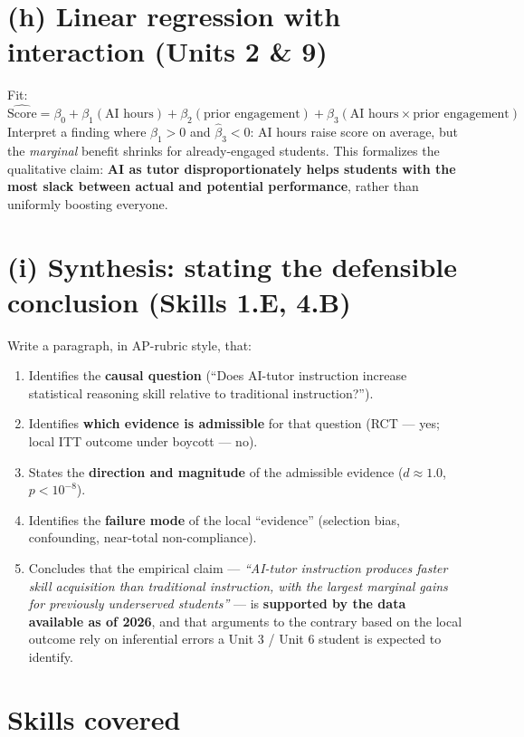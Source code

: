\documentclass[11pt]{article}
\begin{document}
\section{(h) Linear regression with interaction \textnormal{\small(Units 2 \& 9)}}

Fit:
\[
\widehat{\text{Score}} = \beta_0 + \beta_1(\text{AI hours})
  + \beta_2(\text{prior engagement})
  + \beta_3(\text{AI hours} \times \text{prior engagement})
\]
Interpret a finding where $\hat\beta_1 > 0$ and $\hat\beta_3 < 0$:
AI hours raise score on average, but the \emph{marginal} benefit
shrinks for already-engaged students. This formalizes the qualitative
claim: \textbf{AI as tutor disproportionately helps students with the
most slack between actual and potential performance}, rather than
uniformly boosting everyone.

\section{(i) Synthesis: stating the defensible conclusion \textnormal{\small(Skills 1.E, 4.B)}}

Write a paragraph, in AP-rubric style, that:
\begin{enumerate}[leftmargin=*]
  \item Identifies the \textbf{causal question} (``Does AI-tutor
  instruction increase statistical reasoning skill relative to
  traditional instruction?'').
  \item Identifies \textbf{which evidence is admissible} for that
  question (RCT --- yes; local ITT outcome under boycott --- no).
  \item States the \textbf{direction and magnitude} of the
  admissible evidence ($d \approx 1.0$, $p < 10^{-8}$).
  \item Identifies the \textbf{failure mode} of the local
  ``evidence'' (selection bias, confounding, near-total
  non-compliance).
  \item Concludes that the empirical claim ---
  \emph{``AI-tutor instruction produces faster skill acquisition
  than traditional instruction, with the largest marginal gains for
  previously underserved students''} --- is \textbf{supported by the
  data available as of 2026}, and that arguments to the contrary
  based on the local outcome rely on inferential errors a Unit 3 /
  Unit 6 student is expected to identify.
\end{enumerate}

\section*{Skills covered}
\end{document}
